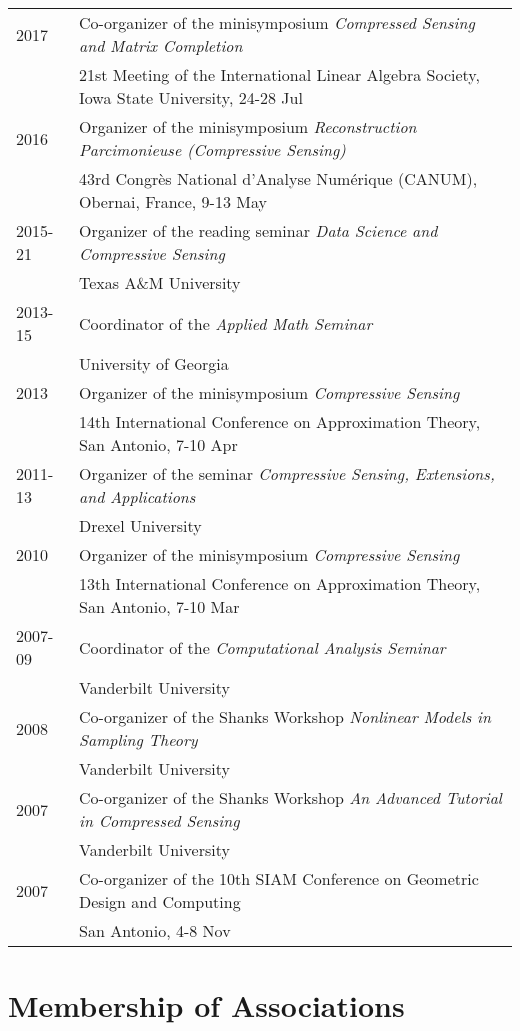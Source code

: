 \documentclass[11pt]{article}
\begin{document}
\begin{tabular}{ll}
2017 & Co-organizer of the minisymposium {\sl Compressed Sensing and Matrix Completion}\\
& 
21st Meeting of the International Linear Algebra Society,
Iowa State University, 24-28 Jul\\
2016 & Organizer of the minisymposium {\sl Reconstruction Parcimonieuse (Compressive Sensing)}\\
& 43rd Congr\`{e}s National d'Analyse Num\'{e}rique (CANUM), Obernai, France, 9-13 May\\
2015-21 & Organizer of the reading seminar {\sl Data Science and Compressive Sensing}\\
& Texas A\&M University\\
2013-15 & Coordinator of the {\sl Applied Math Seminar}\\
& University of Georgia\\
2013 & Organizer of the minisymposium {\sl Compressive Sensing}\\
& 14th International Conference on Approximation Theory, San Antonio, 7-10 Apr\\
2011-13 & Organizer of the seminar {\sl Compressive Sensing, Extensions, and Applications}\\
& Drexel University\\
2010 & Organizer of the minisymposium {\sl Compressive Sensing}\\
& 13th International Conference on Approximation Theory, San Antonio, 7-10 Mar\\
2007-09 & Coordinator of the {\sl Computational Analysis Seminar}\\
& Vanderbilt University\\
2008 & Co-organizer of the Shanks Workshop {\sl Nonlinear Models in Sampling Theory}\\
& Vanderbilt University\\
2007 & Co-organizer of the Shanks Workshop {\sl An Advanced Tutorial in Compressed Sensing}\\
& Vanderbilt University\\
2007 &  Co-organizer of the 10th SIAM Conference on Geometric Design and Computing\\
& San Antonio, 4-8 Nov
\end{tabular}



\section{Membership of Associations}
\end{document}
